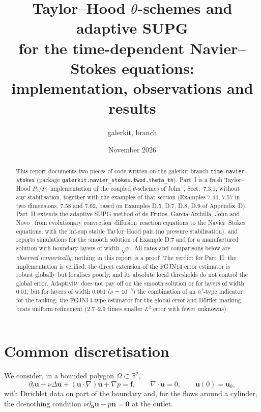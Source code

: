 \documentclass[11pt,a4paper]{article}
\title{Taylor--Hood $\theta$-schemes and adaptive SUPG\\for the time-dependent Navier--Stokes equations:\\implementation, observations and results}
\author{galerkit, branch \code{time-navier-stokes}}
\date{November 2026}
\newcommand{\bu}{\boldsymbol{u}}
\newcommand{\bff}{\boldsymbol{f}}
\newcommand{\code}[1]{\texttt{#1}}
\begin{document}
\maketitle

\begin{abstract}
This report documents two pieces of code written on the galerkit branch \code{time-navier-stokes}
(package \code{galerkit.\allowbreak navier\_stokes.\allowbreak twod.\allowbreak theta\_th}).
Part~I is a fresh Taylor--Hood $P_2/P_1$ implementation of the coupled $\theta$-schemes of
John~\cite{John2016}, Sect.~7.3.1, without any stabilisation, together with the examples of that section
(Examples 7.44, 7.57 in two dimensions, 7.58 and 7.62, based on Examples D.5, D.7, D.8, D.9 of Appendix~D).
Part~II extends the adaptive SUPG method of de Frutos, Garc\'{\i}a-Archilla, John and Novo~\cite{FGJN14}
from evolutionary convection--diffusion--reaction equations to the Navier--Stokes equations, with the
inf-sup stable Taylor--Hood pair (no pressure stabilisation), and reports simulations for the smooth
solution of Example D.7 and for a manufactured solution with boundary layers of width $\sqrt\nu$.
All rates and comparisons below are \emph{observed numerically}; nothing in this report is a proof.
The verdict for Part~II: the implementation is verified; the direct extension of the FGJN14 error estimator is
robust globally but localises poorly, and its absolute local thresholds do not control the global error.
Adaptivity does not pay off on the smooth solution or for layers of width 0.01, but for layers of width 0.001
($\nu=10^{-6}$) the combination of an $h^1$-type indicator for the ranking, the FGJN14-type estimator for the
global error and D\"orfler marking beats uniform refinement (2.7--2.9 times smaller $L^2$ error with fewer
unknowns).
\end{abstract}

\tableofcontents

\section{Common discretisation}

We consider, in a bounded polygon $\Omega\subset\mathbb{R}^2$,
\begin{equation}\label{eq:nse}
\partial_t\bu-\nu\Delta\bu+(\bu\cdot\nabla)\bu+\nabla p=\bff,\qquad \nabla\cdot\bu=0,\qquad \bu(0)=\bu_0,
\end{equation}
with Dirichlet data on part of the boundary and, for the flows around a cylinder, the do-nothing condition
$\nu\partial_{\boldsymbol n}\bu-p\boldsymbol n=\boldsymbol 0$ at the outlet.
\end{document}
